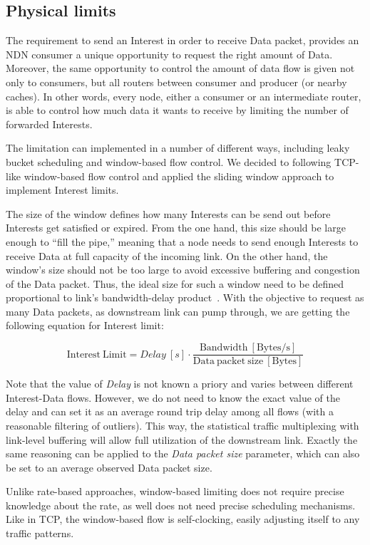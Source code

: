 \subsection{Physical limits}
\label{sec:physical limits}

The requirement to send an Interest in order to receive Data packet, provides an NDN consumer a unique opportunity to request the right amount of Data.
Moreover, the same opportunity to control the amount of data flow is given not only to consumers, but all routers between consumer and producer (or nearby caches).  
In other words, every node, either a consumer or an intermediate router, is able to control how much data it wants to receive by limiting the number of forwarded Interests.

The limitation can implemented in a number of different ways, including leaky bucket scheduling and window-based flow control.
We decided to following TCP-like window-based flow control and applied the sliding window approach to implement Interest limits.

The size of the window defines how many Interests can be send out before Interests get satisfied or expired.
From the one hand, this size should be large enough to ``fill the pipe,'' meaning that a node needs to send enough Interests to receive Data at full capacity of the incoming link.
On the other hand, the window's size should not be too large to avoid excessive buffering and congestion of the Data packet.
Thus, the ideal size for such a window need to be defined proportional to link's bandwidth-delay product~\cite{tcp-survey}.
With the objective to request as many Data packets, as downstream link can pump through, we are getting the following equation for Interest limit:

\[
\mathrm{Interest\ Limit} = Delay\ [s] \cdot \frac{\mathrm{Bandwidth\ [Bytes/s]}}{\mathrm{Data\ packet\ size\ [Bytes]}}
\]

Note that the value of \textit{Delay} is not known a priory and varies between different Interest-Data flows.
However, we do not need to know the exact value of the delay and can set it as an average round trip delay among all flows (with a reasonable filtering of outliers).
This way, the statistical traffic multiplexing with link-level buffering will allow full utilization of the downstream link.
Exactly the same reasoning can be applied to the \textit{Data packet size} parameter, which can also be set to an average observed Data packet size.

Unlike rate-based approaches, window-based limiting does not require precise knowledge about the rate, as well does not need precise scheduling mechanisms.
Like in TCP, the window-based flow is self-clocking, easily adjusting itself to any traffic patterns.

